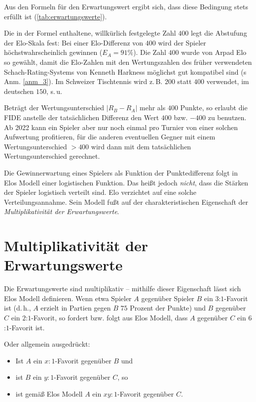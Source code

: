 Aus den Formeln für den Erwartungswert ergibt sich, dass diese Bedingung stets erfüllt ist (\autoref{tab:erwartungswerte}).

Die in der Formel enthaltene, willkürlich festgelegte Zahl $400$ legt die Abstufung der Elo-Skala fest: Bei einer Elo-Differenz von $400$ wird der Spieler höchstwahrscheinlich gewinnen ($E_{A} = 91 \%$). Die Zahl $400$ wurde von Arpad Elo so gewählt, damit die Elo-Zahlen mit den Wertungszahlen des früher verwendeten Schach-Rating-Systems von Kenneth Harkness möglichst gut kompatibel sind (s Anm. \ref{anm_3}). Im Schweizer Tischtennis wird z.\,B. $200$ statt $400$ verwendet, im deutschen $150$, s.\,u.

Beträgt der Wertungsunterschied $|R_{B} - R_{A}|$ mehr als $400$ Punkte, so erlaubt die FIDE anstelle der tatsächlichen Differenz den Wert $400$ bzw. $-400$ zu benutzen. Ab 2022 kann ein Spieler aber nur noch einmal pro Turnier von einer solchen Aufwertung profitieren, für die anderen eventuellen Gegner mit einem Wertungsunterschied $> 400$ wird dann mit dem tatsächlichen Wertungsunterschied gerechnet.


Die Gewinnerwartung eines Spielers als Funktion der Punktedifferenz folgt in Elos Modell einer logistischen Funktion. Das heißt jedoch \textit{nicht}, dass die Stärken der Spieler logistisch verteilt sind. Elo verzichtet auf eine solche Verteilungsannahme. Sein Modell fußt auf der charakteristischen Eigenschaft der \textit{Multiplikativität der Erwartungswerte}.


\section{Multiplikativität der Erwartungswerte}

Die Erwartungswerte sind multiplikativ -- mithilfe dieser Eigenschaft lässt sich Elos Modell definieren. Wenn etwa Spieler $A$ gegenüber Spieler $B$ ein $3$:$1$-Favorit ist (d.\,h., $A$ erzielt in Partien gegen $B$ $75$ Prozent der Punkte) und $B$ gegenüber $C$ ein $2$:$1$-Favorit, so fordert bzw. folgt aus Elos Modell, dass $A$ gegenüber $C$ ein $6$:$1$-Favorit ist.

Oder allgemein ausgedrückt:

\begin{itemize}
    \item[] Ist $A$ ein $x : 1$-Favorit gegenüber $B$ und
    \item[] ist $B$ ein $y : 1$-Favorit gegenüber $C$, so
    \item[] ist gemäß Elos Modell $A$ ein $xy : 1$-Favorit gegenüber $C$.
\end{itemize}

